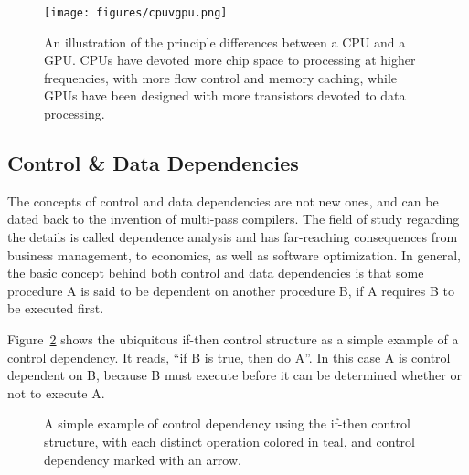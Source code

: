 \begin{figure}[ht]
\ffigbox
	{\texttt{[image: figures/cpuvgpu.png]}}%
	{\caption[CPU vs GPU Construction]{An illustration of the principle differences between a CPU and a GPU. CPUs have devoted more chip space to processing at higher frequencies, with more flow control and memory caching, while GPUs have been designed with more transistors devoted to data processing.}\label{fig:cpuvgpu}}
\end{figure}

%
%
%
%
\subsection{Control \& Data Dependencies}
\label{ch2sPPssCDD}

The concepts of control and data dependencies are not new ones, and can be dated back to the invention of multi-pass compilers. The field of study regarding the details is called dependence analysis and has far-reaching consequences from business management, to economics, as well as software optimization. In general, the basic concept behind both control and data dependencies is that some procedure A is said to be dependent on another procedure B, if A requires B to be executed first.

Figure~\ref{fig:simpleControlDependency} shows the ubiquitous if-then control structure as a simple example of a control dependency. It reads, ``if B is true, then do A''. In this case A is control dependent on B, because B must execute before it can be determined whether or not to execute A.

\begin{figure}[ht]
	
	{\caption[If-Then Control Dependency]{A simple example of control dependency using the if-then control structure, with each distinct operation colored in teal, and control dependency marked with an arrow.}\label{fig:simpleControlDependency}}
\end{figure}


